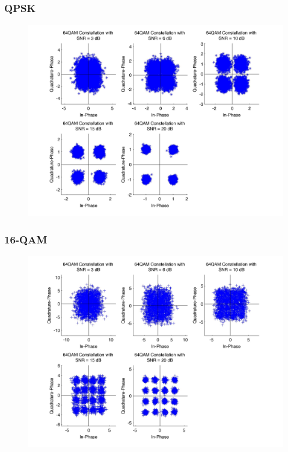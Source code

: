 \documentclass[]{article}
\begin{document}
\subsubsection{QPSK}
\begin{figure}[H]
\centering
\includegraphics[width=\textwidth]{qpConst.jpg}
\caption{}
\end{figure}
\subsubsection{16-QAM}
\begin{figure}[H]
\centering
\includegraphics[width=\textwidth]{qam16Const.jpg}
\caption{}
\end{figure}
\end{document}

